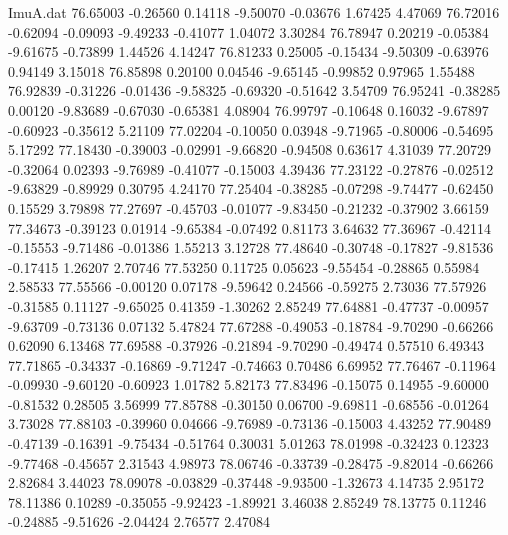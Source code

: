 \begin{filecontents}{ImuA.dat}
  76.65003   -0.26560    0.14118   -9.50070   -0.03676    1.67425    4.47069
  76.72016   -0.62094   -0.09093   -9.49233   -0.41077    1.04072    3.30284
  76.78947    0.20219   -0.05384   -9.61675   -0.73899    1.44526    4.14247
  76.81233    0.25005   -0.15434   -9.50309   -0.63976    0.94149    3.15018
  76.85898    0.20100    0.04546   -9.65145   -0.99852    0.97965    1.55488
  76.92839   -0.31226   -0.01436   -9.58325   -0.69320   -0.51642    3.54709
  76.95241   -0.38285    0.00120   -9.83689   -0.67030   -0.65381    4.08904
  76.99797   -0.10648    0.16032   -9.67897   -0.60923   -0.35612    5.21109
  77.02204   -0.10050    0.03948   -9.71965   -0.80006   -0.54695    5.17292
  77.18430   -0.39003   -0.02991   -9.66820   -0.94508    0.63617    4.31039
  77.20729   -0.32064    0.02393   -9.76989   -0.41077   -0.15003    4.39436
  77.23122   -0.27876   -0.02512   -9.63829   -0.89929    0.30795    4.24170
  77.25404   -0.38285   -0.07298   -9.74477   -0.62450    0.15529    3.79898
  77.27697   -0.45703   -0.01077   -9.83450   -0.21232   -0.37902    3.66159
  77.34673   -0.39123    0.01914   -9.65384   -0.07492    0.81173    3.64632
  77.36967   -0.42114   -0.15553   -9.71486   -0.01386    1.55213    3.12728
  77.48640   -0.30748   -0.17827   -9.81536   -0.17415    1.26207    2.70746
  77.53250    0.11725    0.05623   -9.55454   -0.28865    0.55984    2.58533
  77.55566   -0.00120    0.07178   -9.59642    0.24566   -0.59275    2.73036
  77.57926   -0.31585    0.11127   -9.65025    0.41359   -1.30262    2.85249
  77.64881   -0.47737   -0.00957   -9.63709   -0.73136    0.07132    5.47824
  77.67288   -0.49053   -0.18784   -9.70290   -0.66266    0.62090    6.13468
  77.69588   -0.37926   -0.21894   -9.70290   -0.49474    0.57510    6.49343
  77.71865   -0.34337   -0.16869   -9.71247   -0.74663    0.70486    6.69952
  77.76467   -0.11964   -0.09930   -9.60120   -0.60923    1.01782    5.82173
  77.83496   -0.15075    0.14955   -9.60000   -0.81532    0.28505    3.56999
  77.85788   -0.30150    0.06700   -9.69811   -0.68556   -0.01264    3.73028
  77.88103   -0.39960    0.04666   -9.76989   -0.73136   -0.15003    4.43252
  77.90489   -0.47139   -0.16391   -9.75434   -0.51764    0.30031    5.01263
  78.01998   -0.32423    0.12323   -9.77468   -0.45657    2.31543    4.98973
  78.06746   -0.33739   -0.28475   -9.82014   -0.66266    2.82684    3.44023
  78.09078   -0.03829   -0.37448   -9.93500   -1.32673    4.14735    2.95172
  78.11386    0.10289   -0.35055   -9.92423   -1.89921    3.46038    2.85249
  78.13775    0.11246   -0.24885   -9.51626   -2.04424    2.76577    2.47084

\end{filecontents}
